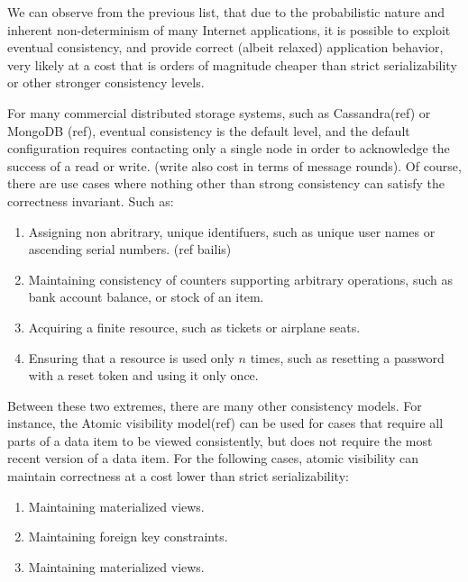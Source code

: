 We can observe from the previous list, that due to the probabilistic nature and 
inherent non-determinism of many Internet applications, it is possible to exploit 
eventual consistency, and provide correct (albeit relaxed) application behavior, 
very likely at a cost that is orders of magnitude cheaper than strict serializability 
or other stronger consistency levels. 

For many commercial distributed storage
systems, such as Cassandra(ref) or MongoDB (ref), eventual consistency is the default
level, and the default configuration requires contacting only a single node in
order to acknowledge the success of a read or write. (write also cost in terms
of message rounds).
Of course, there are use cases where nothing other than strong consistency can
satisfy the correctness invariant. Such as:

\begin{enumerate}

\item Assigning non abritrary, unique identifuers, such as unique user names or
ascending serial numbers. (ref bailis)

\item Maintaining consistency of counters supporting arbitrary operations, such
as bank account balance, or stock of an item. 

\item Acquiring a finite resource, such as tickets or airplane seats. 

\item Ensuring that a resource is used only $n$ times, such as resetting a
password with a reset token and using it only once. 
\end{enumerate}

 Between these two extremes, there are many other consistency models. For
 instance, the Atomic visibility model(ref) can be used for cases that
 require all parts of a data item to be viewed consistently, but does not require
 the most recent version of a data item. For the following cases, 
 atomic visibility can maintain correctness at a cost lower than strict
 serializability: 
\begin{enumerate}
\item Maintaining materialized views.
\item Maintaining foreign key constraints.
\item Maintaining materialized views.
\end{enumerate}

